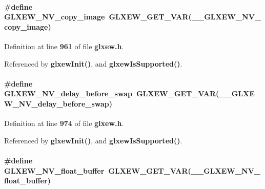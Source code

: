 \paragraph[{G\+L\+X\+E\+W\+\_\+\+N\+V\+\_\+copy\+\_\+image}]{\setlength{\rightskip}{0pt plus 5cm}\#define G\+L\+X\+E\+W\+\_\+\+N\+V\+\_\+copy\+\_\+image~{\bf G\+L\+X\+E\+W\+\_\+\+G\+E\+T\+\_\+\+V\+AR}({\bf \+\_\+\+\_\+\+G\+L\+X\+E\+W\+\_\+\+N\+V\+\_\+copy\+\_\+image})}\label{glxew_8h_aca0fa09437d8937ae4c268637bd7ac05}


Definition at line {\bf 961} of file {\bf glxew.\+h}.



Referenced by {\bf glxew\+Init()}, and {\bf glxew\+Is\+Supported()}.

\paragraph[{G\+L\+X\+E\+W\+\_\+\+N\+V\+\_\+delay\+\_\+before\+\_\+swap}]{\setlength{\rightskip}{0pt plus 5cm}\#define G\+L\+X\+E\+W\+\_\+\+N\+V\+\_\+delay\+\_\+before\+\_\+swap~{\bf G\+L\+X\+E\+W\+\_\+\+G\+E\+T\+\_\+\+V\+AR}({\bf \+\_\+\+\_\+\+G\+L\+X\+E\+W\+\_\+\+N\+V\+\_\+delay\+\_\+before\+\_\+swap})}\label{glxew_8h_aaa80fd6c8c26facc93139d4593deaf12}


Definition at line {\bf 974} of file {\bf glxew.\+h}.



Referenced by {\bf glxew\+Init()}, and {\bf glxew\+Is\+Supported()}.

\paragraph[{G\+L\+X\+E\+W\+\_\+\+N\+V\+\_\+float\+\_\+buffer}]{\setlength{\rightskip}{0pt plus 5cm}\#define G\+L\+X\+E\+W\+\_\+\+N\+V\+\_\+float\+\_\+buffer~{\bf G\+L\+X\+E\+W\+\_\+\+G\+E\+T\+\_\+\+V\+AR}({\bf \+\_\+\+\_\+\+G\+L\+X\+E\+W\+\_\+\+N\+V\+\_\+float\+\_\+buffer})}\label{glxew_8h_a19f2d111fccee0c33c54833ab6bae223}


